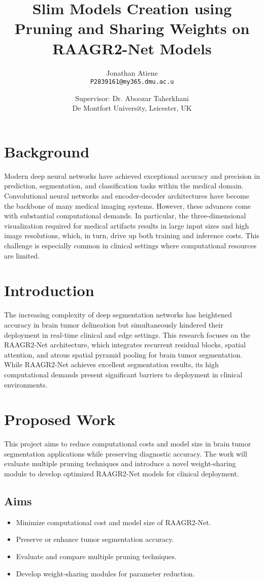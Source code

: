 \documentclass[conference]{IEEEtran}
\title{Slim Models Creation using Pruning and Sharing Weights on RAAGR2-Net Models}
\author{Jonathan Atiene \\ \texttt{P2839161@my365.dmu.ac.u} \and \vspace{0.5em} Supervisor: Dr. Aboozar Taherkhani \\ De Montfort University, Leicester, UK}
\date{}
\begin{document}
\maketitle
\onehalfspacing

\section{Background}
Modern deep neural networks have achieved exceptional accuracy and precision in prediction, segmentation, and classification tasks within the medical domain. Convolutional neural networks and encoder-decoder architectures have become the backbone of many medical imaging systems. However, these advances come with substantial computational demands. In particular, the three-dimensional visualization required for medical artifacts results in large input sizes and high image resolutions, which, in turn, drive up both training and inference costs. This challenge is especially common in clinical settings where computational resources are limited.

\section{Introduction}
The increasing complexity of deep segmentation networks has heightened accuracy in brain tumor delineation but simultaneously hindered their deployment in real-time clinical and edge settings. This research focuses on the RAAGR2-Net architecture, which integrates recurrent residual blocks, spatial attention, and atrous spatial pyramid pooling for brain tumor segmentation. While RAAGR2-Net achieves excellent segmentation results, its high computational demands present significant barriers to deployment in clinical environments.

\section{Proposed Work}
This project aims to reduce computational costs and model size in brain tumor segmentation applications while preserving diagnostic accuracy. The work will evaluate multiple pruning techniques and introduce a novel weight-sharing module to develop optimized RAAGR2-Net models for clinical deployment.

\subsection{Aims}
\begin{itemize}[label=--]
    \item Minimize computational cost and model size of RAAGR2-Net.
    \item Preserve or enhance tumor segmentation accuracy.
    \item Evaluate and compare multiple pruning techniques.
    \item Develop weight-sharing modules for parameter reduction.
\end{itemize}
\end{document}
